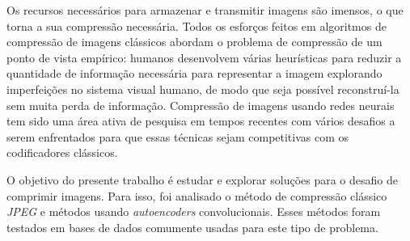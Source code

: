 Os recursos necessários para armazenar e transmitir imagens são imensos, o que torna a sua compressão necessária. Todos os esforços feitos em algoritmos de compressão de imagens clássicos abordam o problema de compressão de um ponto de vista empírico: humanos desenvolvem várias heurísticas para reduzir a quantidade de informação necessária para representar a imagem explorando imperfeições no sistema visual humano, de modo que seja possível reconstruí-la sem muita perda de informação. Compressão de imagens usando redes neurais tem sido uma área ativa de pesquisa em tempos recentes com vários desafios a serem enfrentados para que essas técnicas sejam competitivas com os codificadores clássicos.

O objetivo do presente trabalho é estudar e explorar soluções para o desafio de comprimir imagens. Para isso, foi analisado o método de compressão clássico \textit{JPEG} e métodos usando \textit{autoencoders} convolucionais. Esses métodos foram testados em bases de dados comumente usadas para este tipo de problema. 


